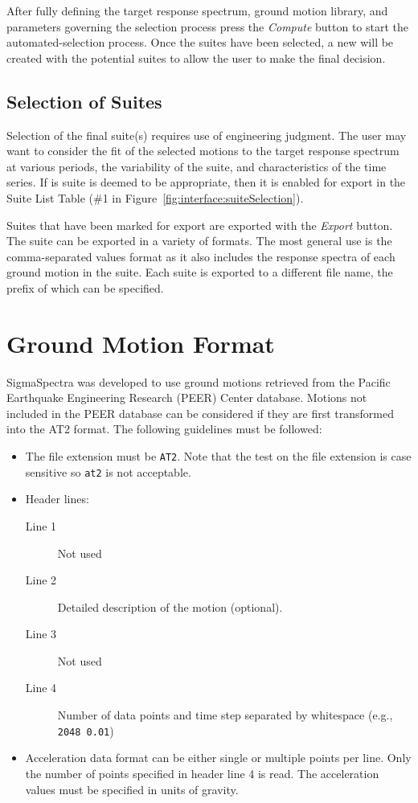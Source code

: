 \documentclass[11pt]{article}
\begin{document}
After fully defining the target response spectrum, ground motion library, and
parameters governing the selection process press the \emph{Compute} button to
start the automated-selection process. Once the suites have been selected, a new
will be created with the potential suites to allow the user to make the final
decision.

\subsection{Selection of Suites}

Selection of the final suite(s) requires use of engineering judgment. The user
may want to consider the fit of the selected motions to the target response
spectrum at various periods, the variability of the suite, and characteristics
of the time series. If is suite is deemed to be appropriate, then it is enabled
for export in the Suite List Table (\#1 in
Figure~\ref{fig:interface:suiteSelection}).

Suites that have been marked for export are exported with the \emph{Export}
button. The suite can be exported in a variety of formats. The most general use
is the comma-separated values format as it also includes the response spectra of
each ground motion in the suite. Each suite is exported to a different file
name, the prefix of which can be specified.


\section{Ground Motion Format}
\label{sec:format}

SigmaSpectra was developed to use ground motions retrieved from the Pacific
Earthquake Engineering Research (PEER) Center database. Motions not included in
the PEER database can be considered if they are first transformed into the AT2
format. The following guidelines must be followed:
\begin{itemize}
  \item The file extension must be \texttt{AT2}. Note that the test on the file
  extension is case sensitive so \texttt{at2} is not acceptable.
    \item Header lines:
      \begin{description}
        \item[Line 1] Not used
        \item[Line 2] Detailed description of the motion (optional).
        \item[Line 3] Not used
        \item[Line 4] Number of data points and time step separated by
          whitespace (e.g., \texttt{2048 0.01})
      \end{description}
    \item Acceleration data format can be either single or multiple points per
      line. Only the number of points specified in header line 4 is read. The
      acceleration values must be specified in units of gravity.
\end{itemize}


\end{document}
